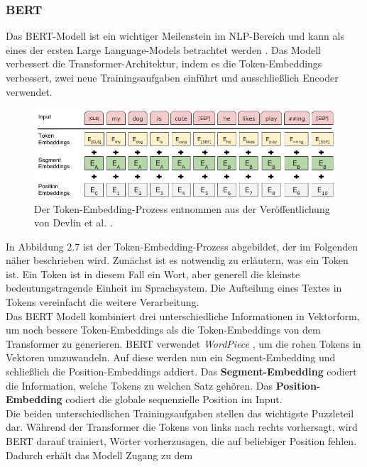 \documentclass[12pt,letterpaper,ngerman]{article}
\begin{document}
\subsubsection{BERT}
Das BERT-Modell  
ist ein wichtiger Meilenstein im NLP-Bereich und kann 
als eines der ersten Large Language-Models betrachtet werden
\cite{conf/naacl/DevlinCLT19}.
Das Modell verbessert die Transformer-Architektur, 
indem es die Token-Embeddings verbessert, zwei neue Trainingsaufgaben einführt
und ausschließlich Encoder verwendet.
\begin{figure}
  \begin{center}
    \includegraphics[scale=0.5]{abb/BERT-Tokens.png}
  \end{center}
  \caption{
    Der Token-Embedding-Prozess entnommen aus der Veröffentlichung
    von Devlin et al.
    \cite{conf/naacl/DevlinCLT19}.
  }
\end{figure}
In Abbildung 2.7 ist der Token-Embedding-Prozess abgebildet,
der im Folgenden näher beschrieben wird. Zunächst ist es 
notwendig zu erläutern, was ein Token ist. Ein Token ist in 
diesem Fall ein Wort, 
aber generell die kleinste bedeutungstragende Einheit im
Sprachsystem. Die Aufteilung eines Textes in Tokens vereinfacht
die weitere Verarbeitung.\\
Das BERT Modell kombiniert drei unterschiedliche Informationen
in Vektorform, um noch bessere Token-Embeddings als die 
Token-Embeddings von dem Transformer zu generieren. BERT
verwendet \textit{WordPiece} 
\cite{wu2016googlesneuralmachinetranslation},
um die rohen Tokens in Vektoren umzuwandeln.
Auf diese werden nun ein Segment-Embedding und schließlich die
Position-Embeddings addiert.
Das {\bf Segment-Embedding} codiert die Information,
welche Tokens zu welchen Satz gehören.
Das {\bf Position-Embedding} codiert die globale sequenzielle
Position im Input.\\
Die beiden unterschiedlichen Trainingsaufgaben stellen das wichtigste
Puzzleteil dar. Während der Transformer die Tokens von links nach rechts
vorhersagt, wird BERT darauf trainiert, Wörter vorherzusagen, die auf
beliebiger Position fehlen. Dadurch erhält das Modell Zugang zu dem
\end{document}
